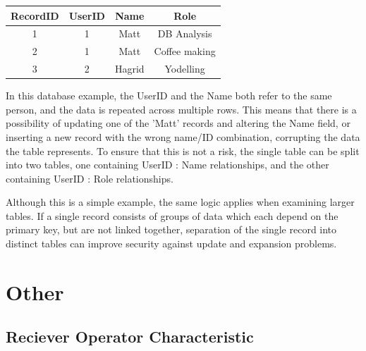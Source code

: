 \documentclass[12pt]{report}
\begin{document}
\begin{tabular}{|c|c|c|c|}\hline
	\centering
RecordID  & UserID  &   Name  &    Role   \\ \hline
1     &     1   &   Matt  & DB Analysis\\ \hline
2     &     1   &   Matt  & Coffee making\\ \hline
3     &     2   &   Hagrid& Yodelling \\ \hline
\end{tabular}
\vspace*{1\baselineskip}

In this database example, the UserID and the Name both refer to the same person, and the data is repeated across multiple rows. This means that there is a possibility of updating one of the 'Matt' records and altering the Name field, or inserting a new record with the wrong name/ID combination, corrupting the data the table represents. To ensure that this is not a risk, the single table can be split into two tables, one containing UserID : Name relationships, and the other containing UserID : Role relationships. 

Although this is a simple example, the same logic applies when examining larger tables. If a single record consists of groups of data which each depend on the primary key, but are not linked together, separation of the single record into distinct tables can improve security against update and expansion problems.


\chapter*{Other}

\section*{Reciever Operator Characteristic}
\end{document}
